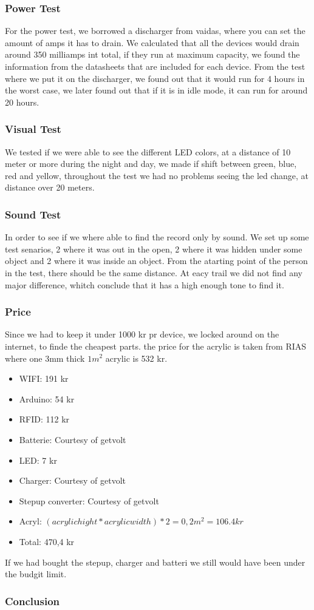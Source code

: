 \subsubsection{Power Test}
For the power test, we borrowed a discharger from vaidas, where you can set the amount of amps it has to drain.
We calculated that all the devices would drain around 350 milliamps int total, if they run at maximum capacity, we found the information from the datasheets that are included for each device.
From the test where we put it on the discharger, we found out that it would run for 4 hours in the worst case, we later found out that if it is in idle mode, it can run for around 20 hours.

\subsubsection{Visual Test}
We tested if we were able to see the different LED colors, at a distance of 10 meter or more during the night and day, we made if shift between green, blue, red and yellow, throughout the test we had no problems seeing the led change, at distance over 20 meters.

\subsubsection{Sound Test}
In order to see if we where able to find the record only by sound.
We set up some test senarios, 2 where it was out in the open, 2 where it was hidden under some object and 2 where it was inside an object. From the atarting point of the person in the test, there should be the same distance.
At eacy trail we did not find any major difference, whitch conclude that it has a high enough tone to find it.

\subsubsection{Price}
Since we had to keep it under 1000 kr pr device, we locked around on the internet, to finde the cheapest parts.
the price for the acrylic is taken from RIAS \cite{RIAS} where one 3mm thick $1 m^2$ acrylic is 532 kr.
\begin{itemize} \itemsep0em
	 \item WIFI: 191 kr \cite{Adafruit}
	 \item Arduino: 54 kr \cite{Sparkfun}
	 \item RFID: 112 kr \cite{Let-Eletronik}
	 \item Batterie: Courtesy of getvolt  \cite{Getvolt}
	 \item LED: 7 kr \cite{Adafruit}
	 \item Charger: Courtesy of getvolt \cite{Getvolt}
	 \item Stepup converter: Courtesy of getvolt  \cite{Getvolt}
	  \item Acryl: $(acrylic hight * acrylic width)*2 = 0,2 m^2 = 106.4 kr $ \cite{RIAS}
	 \item Total: 470,4 kr
\end{itemize}
If we had bought the stepup, charger and batteri we still would have been under the budgit limit.

\subsubsection{Conclusion}
